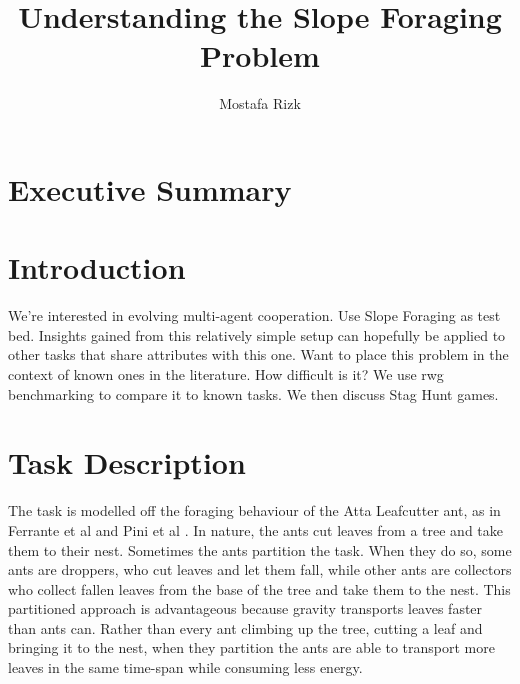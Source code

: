 \documentclass[12pt]{article}
\title{Understanding the Slope Foraging Problem}
\author{Mostafa Rizk}
\begin{document}
\maketitle
\tableofcontents

\section{Executive Summary}

\section{Introduction}

We're interested in evolving multi-agent cooperation.
Use Slope Foraging as test bed.
Insights gained from this relatively simple setup can hopefully be applied to other tasks that share attributes with this one.
Want to place this problem in the context of known ones in the literature.
How difficult is it?
We use rwg benchmarking to compare it to known tasks.
We then discuss Stag Hunt games.

\section{Task Description}\label{task_description}

The task is modelled off the foraging behaviour of the Atta Leafcutter ant, as in Ferrante et al \cite{ferrante:PLOS_CB:2015} and Pini et al \cite{pini:ICSI:2012, pini:Swarm_Intelligence:2011}.
In nature, the ants cut leaves from a tree and take them to their nest. 
Sometimes the ants partition the task. 
When they do so, some ants are droppers, who cut leaves and let them fall, while other ants are collectors who collect fallen leaves from the base of the tree and take them to the nest.
This partitioned approach is advantageous because gravity transports leaves faster than ants can.
Rather than every ant climbing up the tree, cutting a leaf and bringing it to the nest, when they partition the ants are able to transport more leaves in the same time-span while consuming less energy.\\
\end{document}
